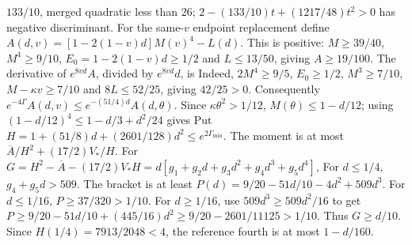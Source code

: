 $133/10$, merged quadratic less than $26$;
$2-(133/10)t+(1217/48)t^2>\allowbreak 0$ has negative discriminant.
For the same-$v$ endpoint replacement define
$A(d,\allowbreak v)=\allowbreak [1-2(1-v)d]M(v)^4-L(d)$.
This is positive: $M\ge\allowbreak 39/40$, $M^4\ge\allowbreak 9/10$,
$E_0=\allowbreak 1-2(1-v)d\ge\allowbreak 1/2$ and $L\le\allowbreak 13/50$, giving $A\ge\allowbreak 19/100$.
The derivative of $e^{8vd}A$, divided by $e^{8vd}d$, is
Indeed, $2M^4\ge\allowbreak 9/5$, $E_0\ge\allowbreak 1/2$, $M^3\ge\allowbreak 7/10$,
$M-\kappa v\ge\allowbreak 7/10$ and $8L\le\allowbreak 52/25$, giving $42/25>\allowbreak 0$.
Consequently $e^{-4\Gamma}A(d,\allowbreak v)\le\allowbreak  e^{-(51/4)d}A(d,\allowbreak \theta)$.
Since $\kappa\theta^2>\allowbreak 1/12$, $M(\theta)\le\allowbreak 1-d/12$;
using $(1-d/12)^4\le\allowbreak 1-d/3+d^2/24$ gives
Put $H=\allowbreak 1+(51/8)d+(2601/128)d^2\le\allowbreak  e^{2\Gamma_{\min}}$.
The moment is at most $\overline A/H^2+(17/2)V_*/H$.
For $G=H^2-\overline A-(17/2)V_*H
=d[g_1+g_2d+g_3d^2+g_4d^3+g_5d^4]$,
For $d\le\allowbreak 1/4$, $g_4+g_5d>\allowbreak 509$.
The bracket is at least $P(d)=\allowbreak 9/20-51d/10-4d^2+509d^3$.
For $d\le\allowbreak 1/16$, $P\ge\allowbreak 37/320>\allowbreak 1/10$.
For $d\ge\allowbreak 1/16$, use $509d^3\ge\allowbreak 509d^2/16$ to get
$P\ge\allowbreak 9/20-51d/10+(445/16)d^2\ge\allowbreak 9/20-2601/11125>\allowbreak 1/10$.
Thus $G\ge\allowbreak  d/10$. Since $H(1/4)=\allowbreak 7913/2048<\allowbreak 4$, the reference fourth
is at most $1-d/160$.

